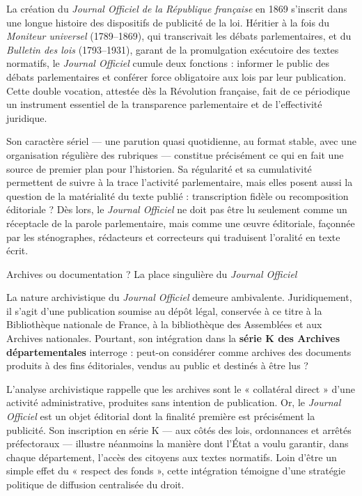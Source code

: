 La création du \emph{Journal Officiel de la République française} en 1869 s’inscrit dans une longue histoire des dispositifs de publicité de la loi. Héritier à la fois du \emph{Moniteur universel} (1789–1869), qui transcrivait les débats parlementaires, et du \emph{Bulletin des lois} (1793–1931), garant de la promulgation exécutoire des textes normatifs, le \emph{Journal Officiel} cumule deux fonctions : informer le public des débats parlementaires et conférer force obligatoire aux lois par leur publication. Cette double vocation, attestée dès la Révolution française, fait de ce périodique un instrument essentiel de la transparence parlementaire et de l’effectivité juridique.

Son caractère sériel — une parution quasi quotidienne, au format stable, avec une organisation régulière des rubriques — constitue précisément ce qui en fait une source de premier plan pour l’historien. Sa régularité et sa cumulativité permettent de suivre à la trace l’activité parlementaire, mais elles posent aussi la question de la matérialité du texte publié : transcription fidèle ou recomposition éditoriale ? Dès lors, le \emph{Journal Officiel} ne doit pas être lu seulement comme un réceptacle de la parole parlementaire, mais comme une œuvre éditoriale, façonnée par les sténographes, rédacteurs et correcteurs qui traduisent l’oralité en texte écrit.

 Archives ou documentation ? La place singulière du \emph{Journal Officiel}

La nature archivistique du \emph{Journal Officiel} demeure ambivalente. Juridiquement, il s’agit d’une publication soumise au dépôt légal, conservée à ce titre à la Bibliothèque nationale de France, à la bibliothèque des Assemblées et aux Archives nationales. Pourtant, son intégration dans la \textbf{série K des Archives départementales} interroge : peut-on considérer comme archives des documents produits à des fins éditoriales, vendus au public et destinés à être lus ?

L’analyse archivistique rappelle que les archives sont le « collatéral direct » d’une activité administrative, produites sans intention de publication. Or, le \emph{Journal Officiel} est un objet éditorial dont la finalité première est précisément la publicité. Son inscription en série K — aux côtés des lois, ordonnances et arrêtés préfectoraux — illustre néanmoins la manière dont l’État a voulu garantir, dans chaque département, l’accès des citoyens aux textes normatifs. Loin d’être un simple effet du « respect des fonds », cette intégration témoigne d’une stratégie politique de diffusion centralisée du droit.

